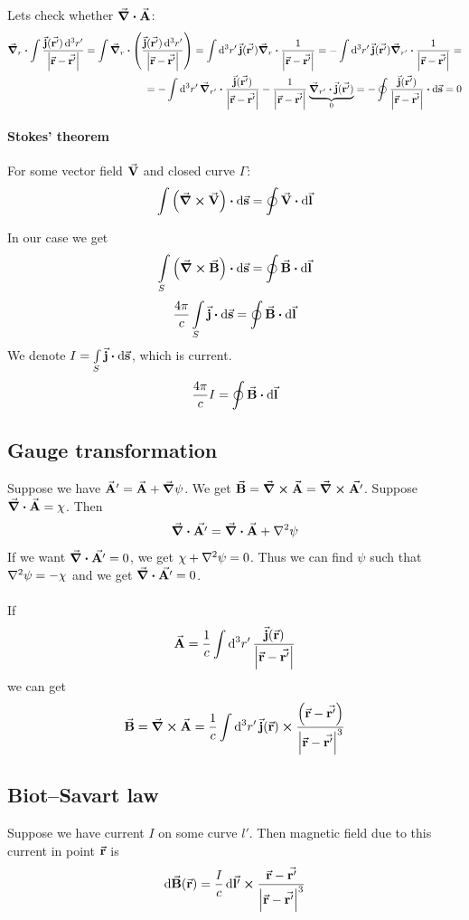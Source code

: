 Lets check whether $\div{\va{A}}$:
\begin{align*}
\grad_r \vdot {\int \frac{\va{j} (\va{r'}) \dd[3]{r'}}{\qty|\va{r} -\va{r'}|}} =  \int \grad_r \vdot \qty(\frac{\va{j} (\va{r'}) \dd[3]{r'}}{\qty|\va{r} -\va{r'}|})  = \int \dd[3]{r'}  \va{j} (\va{r'}) \grad_{r} \vdot \frac{1 }{\qty|\va{r} -\va{r'}|} = -\int \dd[3]{r'}  \va{j} (\va{r'}) \grad_{r'} \vdot \frac{1 }{\qty|\va{r} -\va{r'}|} =\\= -\int \dd[3]{r'}  \grad_{r'} \vdot \frac{\va{j} (\va{r'})  }{\qty|\va{r} -\va{r'}|} - \frac{1 }{\qty|\va{r} -\va{r'}|} \underbrace{\grad_{r'} \vdot \va{j} (\va{r'}) }_{0} = - \oint \frac{\va{j} (\va{r'})  }{\qty|\va{r} -\va{r'}|} \vdot \dd{\va{s}} = 0
\end{align*}
\paragraph{Stokes' theorem}
For some vector field $\va{V}$ and closed curve $\Gamma$:
$$\int \qty(\curl{\va{V}}) \vdot \dd{\va{s}} = \oint \va{V} \vdot \dd{\va{l}}$$

In our case we get
$$\int\limits_{S} \qty(\curl{\va{B}}) \vdot \dd{\va{s}} = \oint \va{B} \vdot \dd{\va{l}}$$
$$\frac{4\pi}{c}\int\limits_{S} \va{j} \vdot \dd{\va{s}} = \oint \va{B} \vdot \dd{\va{l}}$$
We denote $I = \int\limits_{S} \va{j} \vdot \dd{\va{s}}$, which is current.
$$\frac{4\pi}{c}I = \oint \va{B} \vdot \dd{\va{l}}$$
\subsection{Gauge transformation}
Suppose we have $\va{A}' = \va{A} + \grad{\psi}$. We get $\va{B} = \curl{\va{A}} = \curl{\va{A'}}$.
Suppose $\div{\va{A}} = \chi$. Then
$$\div{\va{A'}} = \div{\va{A}} + \laplacian{\psi}$$
If we want $\div{\va{A'}} = 0$, we get $\chi + \laplacian{\psi} = 0$. Thus we can find $\psi$ such that $\laplacian{\psi} = -\chi$ and we get $\div{\va{A'}} = 0$.

\paragraph{}
If 
$$\va{A} = \frac{1}{c} \int \dd[3]{r'} \frac{\va{j}(\va{r})}{\abs{\va{r}-\va{r'}}}$$
we can get
$$\va{B} = \curl{\va{A}} = \frac{1}{c} \int \dd[3]{r'} \va{j}(\va{r}) \cross \frac{\qty(\va{r}-\va{r'})}{\abs{\va{r}-\va{r'}}^3}$$
\subsection{Biot–Savart law}
Suppose we have current $I$ on some curve $l'$. Then magnetic field due to this current in point $\va{r}$ is
$$\dd{\va{B}(\va{r})} = \frac{I}{c} \dd{\va{l'}} \cross \frac{\va{r}-\va{r'}}{\abs{\va{r}-\va{r'}}^3}$$
